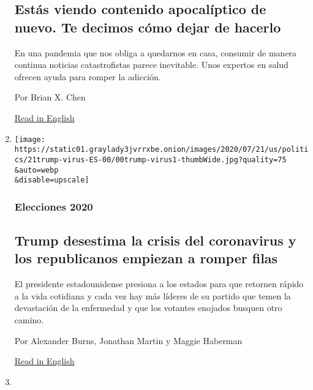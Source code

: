 \begin{enumerate}
  \hypertarget{estuxe1s-viendo-contenido-apocaluxedptico-de-nuevo-te-decimos-cuxf3mo-dejar-de-hacerlo}{%
  \subsection{Estás viendo contenido apocalíptico de nuevo. Te decimos
  cómo dejar de
  hacerlo}\label{estuxe1s-viendo-contenido-apocaluxedptico-de-nuevo-te-decimos-cuxf3mo-dejar-de-hacerlo}}

  En una pandemia que nos obliga a quedarnos en casa, consumir de manera
  continua noticias catastrofistas parece inevitable. Unos expertos en
  salud ofrecen ayuda para romper la adicción.

  Por Brian X. Chen

  \href{https://www.nytimes3xbfgragh.onion/2020/07/15/technology/personaltech/youre-doomscrolling-again-heres-how-to-snap-out-of-it.html}{Read
  in English}
\item
  \href{/es/2020/07/21/espanol/estados-unidos/donald-trump-coronavirus-republicanos.html}{}

  \texttt{[image: https://static01.graylady3jvrrxbe.onion/images/2020/07/21/us/politics/21trump-virus-ES-00/00trump-virus1-thumbWide.jpg?quality=75\\\&auto=webp\\\&disable=upscale]}

  \hypertarget{elecciones-2020}{%
  \subsubsection{Elecciones 2020}\label{elecciones-2020}}

  \hypertarget{trump-desestima-la-crisis-del-coronavirus-y-los-republicanos-empiezan-a-romper-filas}{%
  \subsection{Trump desestima la crisis del coronavirus y los
  republicanos empiezan a romper
  filas}\label{trump-desestima-la-crisis-del-coronavirus-y-los-republicanos-empiezan-a-romper-filas}}

  El presidente estadounidense presiona a los estados para que retornen
  rápido a la vida cotidiana y cada vez hay más líderes de su partido
  que temen la devastación de la enfermedad y que los votantes enojados
  busquen otro camino.

  Por Alexander Burns, Jonathan Martin y Maggie Haberman

  \href{https://www.nytimes3xbfgragh.onion/2020/07/19/us/politics/republicans-contradict-trump-coronavirus.html}{Read
  in English}
\item
  \href{/es/2020/07/21/espanol/estados-unidos/coronavirus-valle-de-texas.html}{}


\end{enumerate}
